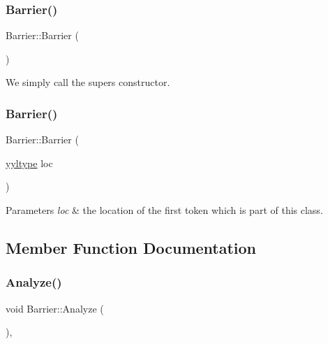 \subsubsection{\texorpdfstring{Barrier()}{Barrier()}\hspace{0.1cm}{\footnotesize\ttfamily [1/2]}}
{\footnotesize\ttfamily Barrier\+::\+Barrier (\begin{DoxyParamCaption}{ }\end{DoxyParamCaption})\hspace{0.3cm}{\ttfamily [inline]}}

We simply call the super\textquotesingle{}s constructor. \mbox{\label{class_barrier_acbb7d7324fef5bfefd7424c957b5c25d}} 
\subsubsection{\texorpdfstring{Barrier()}{Barrier()}\hspace{0.1cm}{\footnotesize\ttfamily [2/2]}}
{\footnotesize\ttfamily Barrier\+::\+Barrier (\begin{DoxyParamCaption}\item[{\hyperlink{structyyltype}{yyltype}}]{loc }\end{DoxyParamCaption})\hspace{0.3cm}{\ttfamily [inline]}}


\begin{DoxyParams}{Parameters}
{\em loc} & the location of the first token which is part of this class. \\
\hline
\end{DoxyParams}


\subsection{Member Function Documentation}
\mbox{\label{class_barrier_af36430f51da20c09b6e3fa1d6e875fef}} 
\subsubsection{\texorpdfstring{Analyze()}{Analyze()}}
{\footnotesize\ttfamily void Barrier\+::\+Analyze (\begin{DoxyParamCaption}{ }\end{DoxyParamCaption})\hspace{0.3cm}{\ttfamily [inline]}, {\ttfamily [virtual]}}

